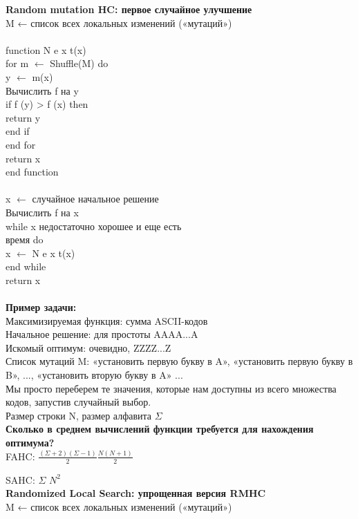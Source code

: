 \textbf{Random mutation HC: первое случайное улучшение}\\
M ← список всех локальных изменений («мутаций») \\
\\
function N e x t(x)  \\
\tab for m $\leftarrow$ Shuffle(M) do\\  
\tab \tab y $\leftarrow$ m(x)\\  
\tab \tab Вычислить f на y\\  
\tab \tab if f (y) > f (x) then\\  
\tab \tab \tab return y\\   
\tab \tab end if\\  
\tab end for\\  
\tab return x\\  
end function \\ 
\\
x $\leftarrow$ случайное начальное решение\\  
Вычислить f на x\\  
while x недостаточно хорошее и еще есть\\  
время do \\ 
\tab x $\leftarrow$ N e x t(x)\\  
end while \\
return x \\
\\
\textbf{Пример задачи:}\\
Максимизируемая функция: сумма ASCII-кодов\\
Начальное решение: для простоты AAAA...A\\
Искомый оптимум: очевидно, ZZZZ...Z\\
Список мутаций M: «установить первую букву в A», «установить первую букву в B», ..., «установить вторую букву в A» ...\\
Мы просто переберем те значения, которые нам доступны из всего множества кодов, запустив случайный выбор. \\
Размер строки N, размер алфавита $\Sigma$ \\

\textbf{Сколько в среднем вычислений функции требуется для нахождения оптимума?}\\
FAHC: $\frac{(\Sigma + 2)(\Sigma - 1)}{2} \frac{N(N+1)}{2}$

SAHC: $\Sigma$ $N^2$ \\


\textbf{Randomized Local Search: упрощенная версия RMHC}\\
M ← список всех локальных изменений («мутаций») \\

